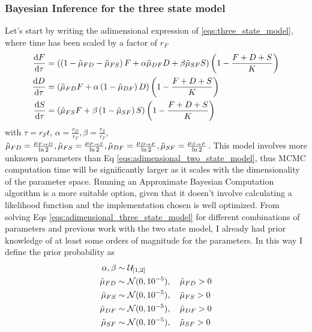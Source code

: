 \documentclass{article}
\begin{document}
\subsubsection{Bayesian Inference for the three state model}
Let's start by writing the adimensional expression of \ref{eqs:three_state_model}, where time has been scaled by a factor of $r_F$
\begin{subequations}\label{eqs:adimensional_three_state_model}
\begin{align}
\dv{F}{\tau} &= \left( \left(1 - \Tilde{\mu}_{FD} - \Tilde{\mu}_{FS}\right)F + \alpha \Tilde{\mu}_{DF} D + \beta \Tilde{\mu}_{SF} S \right)\left(1-\frac{F + D + S}{K}\right)\\
\dv{D}{\tau} &=\left(  \Tilde{\mu}_{FD}F + \alpha\left(1 -\Tilde{\mu}_{DF}\right)D \right) \left(1-\frac{F + D + S}{K}\right) \\
\dv{S}{\tau} &= \left( \Tilde{\mu}_{FS}F + \beta\left(1 - \Tilde{\mu}_{SF}\right)S \right) \left(1-\frac{F + D + S}{K}\right) 
\end{align}
\end{subequations}
with $\tau = r_F t$, $\alpha = \frac{r_D}{r_F}, \beta = \frac{r_S}{r_F}$, $\Tilde{\mu}_{FD} = \frac{\mu_{F\rightarrow D}}{\ln{2}}, \Tilde{\mu}_{FS} = \frac{\mu_{F\rightarrow S}}{\ln{2}}, \Tilde{\mu}_{DF} = \frac{\mu_{D\rightarrow F}}{\ln{2}}, \Tilde{\mu}_{SF} = \frac{\mu_{S\rightarrow F}}{\ln{2}}$.
This model involves more unknown parameters than Eq \ref{eqs:adimensional_two_state_model}, thus MCMC computation time will be significantly larger as it scales with the dimensionality of the parameter space. Running an Approximate Bayesian Computation algorithm is a more suitable option, given that it doesn't involve calculating a likelihood function and the implementation chosen is well optimized. From solving Eqs \ref{eqs:adimensional_three_state_model} for different combinations of parameters and previous work with the two state model, I already had prior knowledge of at least some orders of magnitude for the parameters. In this way I define the prior probability as
\begin{subequations}
    \begin{align*}
        \alpha, \beta &\sim \mathcal{U}_{[1,2]}\\
        \Tilde{\mu}_{FD} &\sim \mathcal{N}(0,10^{-5}), \quad \Tilde{\mu}_{FD}>0 \\
        \Tilde{\mu}_{FS} &\sim \mathcal{N}(0,10^{-5}), \quad \Tilde{\mu}_{FS}>0 \\
        \Tilde{\mu}_{DF} &\sim \mathcal{N}(0,10^{-5}), \quad \Tilde{\mu}_{DF}>0 \\
        \Tilde{\mu}_{SF} &\sim \mathcal{N}(0,10^{-5}), \quad \Tilde{\mu}_{SF}>0 
    \end{align*}
\end{subequations}
\end{document}
